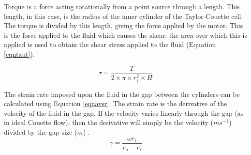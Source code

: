 \documentclass[twoside,a4]{report}
\begin{document}
	
	Torque is a force acting rotationally from a point source through a length. This length, in this case, is the radius of the inner cylinder of the Taylor-Couette cell. The torque is divided by this length, giving the force applied by the motor. This is the force applied to the fluid which causes the shear: the area over which this is applied is used to obtain the shear stress applied to the fluid (Equation \ref{eqntaut}).
	
	\begin{equation}
	\tau = \frac{T}{2 \times \pi \times r_i^2 \times H}
	\label{eqntaut}
	\end{equation}
	
	
	\noindent
	The strain rate imposed upon the fluid in the gap between the cylinders can be calculated using Equation \ref{eqnavsr}. The strain rate is the derivative of the velocity of the fluid in the gap. If the velocity varies linearly through the gap (as in ideal Couette flow), then the derivative will simply be the velocity ($ms^{-1}$) divided by the gap size ($m$) \cite{couetteshearcell}.
	\begin{equation}
	\dot{\gamma} = \frac{\omega r_i}{r_o - r_i}
	\label{eqnavsr}
	\end{equation}
	
	
\end{document}
